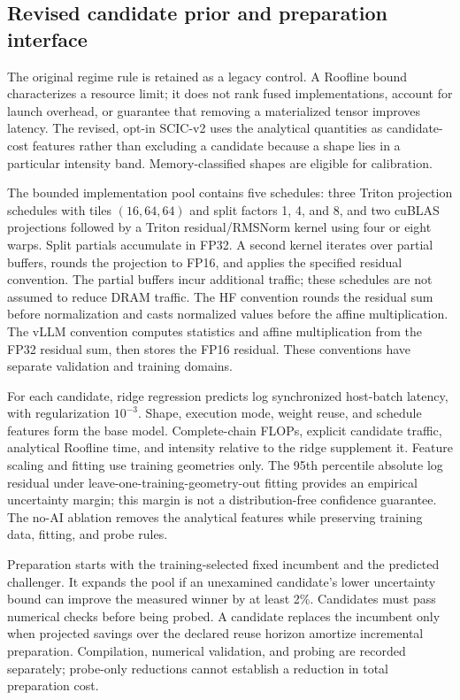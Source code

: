 \subsection{Revised candidate prior and preparation interface}
\label{sec:v2-method}

The original regime rule is retained as a legacy control. A Roofline bound characterizes a resource limit; it does not rank fused implementations, account for launch overhead, or guarantee that removing a materialized tensor improves latency. The revised, opt-in SCIC-v2 uses the analytical quantities as candidate-cost features rather than excluding a candidate because a shape lies in a particular intensity band. Memory-classified shapes are eligible for calibration.

The bounded implementation pool contains five schedules: three Triton projection schedules with tiles $(16,64,64)$ and split factors 1, 4, and 8, and two cuBLAS projections followed by a Triton residual/RMSNorm kernel using four or eight warps. Split partials accumulate in FP32. A second kernel iterates over partial buffers, rounds the projection to FP16, and applies the specified residual convention. The partial buffers incur additional traffic; these schedules are not assumed to reduce DRAM traffic. The HF convention rounds the residual sum before normalization and casts normalized values before the affine multiplication. The vLLM convention computes statistics and affine multiplication from the FP32 residual sum, then stores the FP16 residual. These conventions have separate validation and training domains.

For each candidate, ridge regression predicts log synchronized host-batch latency, with regularization $10^{-3}$. Shape, execution mode, weight reuse, and schedule features form the base model. Complete-chain FLOPs, explicit candidate traffic, analytical Roofline time, and intensity relative to the ridge supplement it. Feature scaling and fitting use training geometries only. The 95th percentile absolute log residual under leave-one-training-geometry-out fitting provides an empirical uncertainty margin; this margin is not a distribution-free confidence guarantee. The no-AI ablation removes the analytical features while preserving training data, fitting, and probe rules.

Preparation starts with the training-selected fixed incumbent and the predicted challenger. It expands the pool if an unexamined candidate's lower uncertainty bound can improve the measured winner by at least 2\%. Candidates must pass numerical checks before being probed. A candidate replaces the incumbent only when projected savings over the declared reuse horizon amortize incremental preparation. Compilation, numerical validation, and probing are recorded separately; probe-only reductions cannot establish a reduction in total preparation cost.

